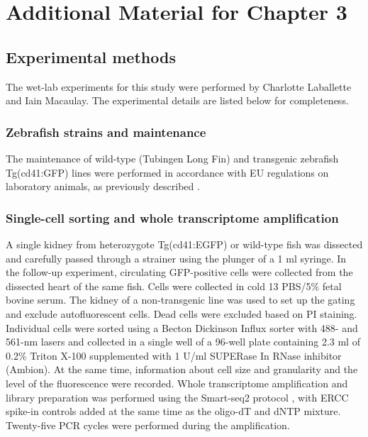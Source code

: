
\chapter{Additional Material for Chapter 3}

\graphicspath{{Appendix2/Figs/}}

\section{Experimental methods} \label{sec:zebrafish-methods}

The wet-lab experiments for this study were performed by Charlotte Laballette and Iain Macaulay. The experimental details are listed below for completeness.

\subsection{Zebrafish strains and maintenance}

The maintenance of wild-type (Tubingen Long Fin) and transgenic zebrafish Tg(cd41:GFP) lines were performed in accordance with EU regulations on laboratory animals, as previously described \cite{Bielczyk-Maczynska2014-hf}.

\subsection{Single-cell sorting and whole transcriptome amplification}

A single kidney from heterozygote Tg(cd41:EGFP) or wild-type fish was dissected and carefully passed through a strainer using the plunger of a 1 ml syringe. In the follow-up experiment, circulating GFP-positive cells were collected from the dissected heart of the same fish. Cells were collected in cold 13 PBS/5\% fetal bovine serum. The kidney of a non-transgenic line was used to set up the gating and exclude autofluorescent cells. Dead cells were excluded based on PI staining. Individual cells were sorted using a Becton Dickinson Influx sorter with 488- and 561-nm lasers \cite{Schulte2015-dh} and collected in a single well of a 96-well plate containing 2.3 ml of 0.2\% Triton X-100 supplemented with 1 U/ml SUPERase In RNase inhibitor (Ambion). At the same time, information about cell size and granularity and the level of the fluorescence were recorded. Whole transcriptome amplification and library preparation was performed using the Smart-seq2 protocol  \cite{Picelli2013-px, Picelli2014-hr}, with ERCC spike-in controls added at the same time as the oligo-dT and dNTP mixture. Twenty-five PCR cycles were performed during the amplification.


